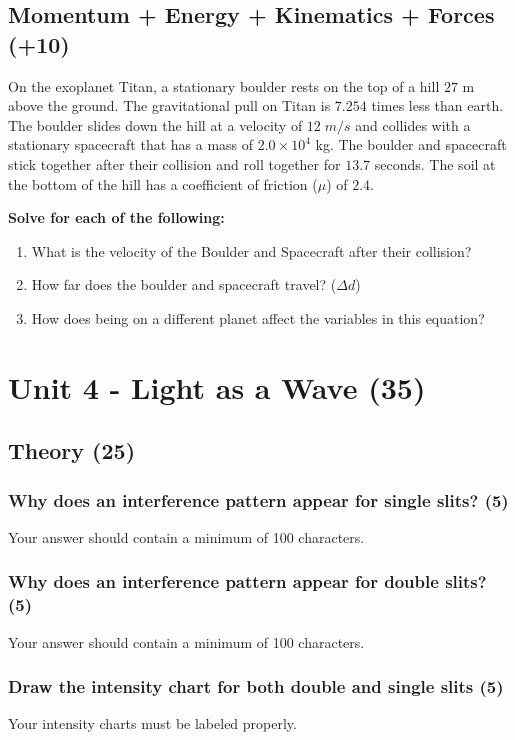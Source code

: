\documentclass{article}
\begin{document}
\subsection{Momentum + Energy + Kinematics + Forces (+10)}
On the exoplanet Titan, a stationary boulder rests on the top of a hill $27$ m above the ground.
The gravitational pull on Titan is $7.254$ times less than earth. The boulder slides down the hill at a
velocity of $12\;m/s$ and collides with a stationary spacecraft that has a mass of
$2.0\times 10^4$ kg. The boulder and spacecraft stick together after their collision and
roll together for $13.7$ seconds. The soil at the bottom of the hill has a coefficient of
friction ($\mu$) of $2.4$.

\vspace{10pt}

\noindent\textbf{Solve for each of the following:}
\begin{enumerate}[label=\alph*)]
    \item What is the velocity of the Boulder and Spacecraft after their collision?
    \item How far does the boulder and spacecraft travel? ($\Delta d$)
    \item How does being on a different planet affect the variables in this equation?
\end{enumerate}\leavevmode

\section{Unit 4 - Light as a Wave (35)}
\subsection{Theory (25)}
\subsubsection{Why does an interference pattern appear for single slits? (5)}
Your answer should contain a minimum of 100 characters.

\subsubsection{Why does an interference pattern appear for double slits? (5)}
Your answer should contain a minimum of 100 characters.

\subsubsection{Draw the intensity chart for both double and single slits (5)}
Your intensity charts must be labeled properly.
\end{document}
